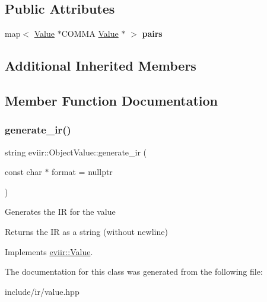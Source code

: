 \subsection*{Public Attributes}
\begin{DoxyCompactItemize}
\item 
\mbox{\label{classeviir_1_1ObjectValue_a650b6fad2e883e7e006ce8ca491a94e1}} 
map$<$ \hyperlink{classeviir_1_1Value}{Value} $\ast$C\+O\+M\+MA \hyperlink{classeviir_1_1Value}{Value} $\ast$ $>$ {\bfseries pairs}
\end{DoxyCompactItemize}
\subsection*{Additional Inherited Members}


\subsection{Member Function Documentation}
\mbox{\label{classeviir_1_1ObjectValue_a72adc8371c09638a785ed3823516e817}} 
\subsubsection{\texorpdfstring{generate\+\_\+ir()}{generate\_ir()}}
{\footnotesize\ttfamily string eviir\+::\+Object\+Value\+::generate\+\_\+ir (\begin{DoxyParamCaption}\item[{const char $\ast$}]{format = {\ttfamily nullptr} }\end{DoxyParamCaption})\hspace{0.3cm}{\ttfamily [virtual]}}

Generates the IR for the value \begin{DoxyReturn}{Returns}
the IR as a string (without newline) 
\end{DoxyReturn}


Implements \hyperlink{classeviir_1_1Value_a0613bf660425df31e230681555f64dea}{eviir\+::\+Value}.



The documentation for this class was generated from the following file\+:\begin{DoxyCompactItemize}
\item 
include/ir/value.\+hpp\end{DoxyCompactItemize}
